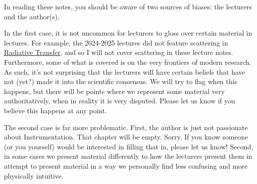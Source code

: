 \documentclass[a4paper,11pt,twoside]{report}
\begin{document}
\begin{sloppypar}

In reading these notes, you should be aware of two sources of biases: the lecturers and the author(s).

In the first case, it is not uncommon for lecturers to gloss over certain material in lectures. For example, the 2024-2025 lectures did not feature scattering in \hyperref[Radiative Transfer]{Radiative Transfer}, and so I will not cover scattering in these lecture notes. Furthermore, some of what is covered is on the very frontiers of modern research. As such, it's not surprising that the lecturers will have certain beliefs that have not (yet?) made it into the scientific consensus. We will try to flag when this happens, but there will be points where we represent some material very authoritatively, when in reality it is very disputed. Please let us know if you believe this happens at any point.

The second case is far more problematic. First, the author is just not passionate about Instrumentation. That chapter will be empty. Sorry. If you know someone (or you yourself) would be interested in filling that in, please let us know! Second, in some cases we present material differently to how the lecturers present them in attempt to present material in a way we personally find less confusing and more physically intuitive.


\end{sloppypar}
\end{document}
